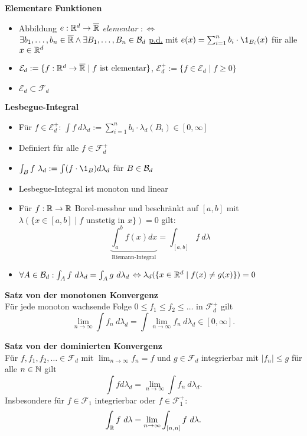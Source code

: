 \textbf{Elementare Funktionen}
\begin{itemize}

\item Abbildung $e:\mathbb{R}^d\to\overline{\mathbb{R}}$ \textit{elementar} $:\Leftrightarrow$\\
$\exists b_1,\ldots,b_n\in\overline{\mathbb{R}}\wedge\exists B_1,\ldots,B_n\in\mathcal{B}_{d}$
\underline{p.d.} mit $e(x)=\sum_{i=1}^{n} b_i\cdot \1_{B_i}(x)$ für alle $x\in\mathbb{R}^d$

\item $\mathcal{E}_d:=\{f:\mathbb{R}^d\to\overline{\mathbb{R}}\mid f \text{ ist elementar}\}$,
$\mathcal{E}_d^+:=\{f\in\mathcal{E}_d\mid f\geq 0\}$

\item $\mathcal{E}_d\subset\mathcal{F}_d$
\end{itemize}

\textbf{Lesbegue-Integral}
\begin{itemize}
\item Für $f\in\mathcal{E}_d^+$: 
$\int f~d\lambda_d:=\sum_{i=1}^{n} b_i\cdot\lambda_d(B_i)\in [0,\infty]$

\item Definiert für alle $f\in\mathcal{F}_d^+$

\item $\int_B f~\lambda_d:=\int (f\cdot \1_B)d\lambda_d$ für $B\in\mathcal{B}_{d}$

\item Lesbegue-Integral ist monoton und linear

\item Für $f:\mathbb{R}\to\mathbb{R}$ Borel-messbar und beschränkt auf $[a,b]$ mit
\mbox{$\lambda(\{x\in[a,b]\mid f \text{ unstetig in }x\})=0$} gilt:
\[
	\underbrace{\int_{a}^{b}f(x)dx}_{\text{Riemann-Integral}}
	= \int_{[a,b]} f~d\lambda
\]

\item $\forall A\in\mathcal{B}_{d}:\int_A f~d\lambda_d = \int_A g~d\lambda_d$
$\Leftrightarrow \lambda_d(\{x\in\mathbb{R}^d\mid f(x)\neq g(x)\})=0$
\end{itemize}

\textbf{Satz von der monotonen Konvergenz}\\
Für jede monoton wachsende Folge $0\leq f_1\leq f_2\leq\ldots$
in $\mathcal{F}_d^+$ gilt
\[\lim_{n\to\infty}\int f_n~d\lambda_d=
\int\lim_{n\to\infty} f_n~d\lambda_d\in [0,\infty].\]

\textbf{Satz von der dominierten Konvergenz}\\
Für $f,f_1,f_2,\ldots\in\mathcal{F}_d$ mit $\lim_{n\to\infty} f_n=f$ 
und $g\in\mathcal{F}_d$ integrierbar mit $|f_n|\leq g$ für alle $n\in\mathbb{N}$ gilt
\[
	\int fd\lambda_d=\lim_{n\to\infty} \int f_n~d\lambda_d.
\]
Insbesondere für $f\in\mathcal{F}_1$ integrierbar oder $f\in\mathcal{F}_1^+$:
\[
	\int_{\mathbb{R}} f~d\lambda=\lim_{n\to\infty} \int_{[n,n]} f~d\lambda.
\]


